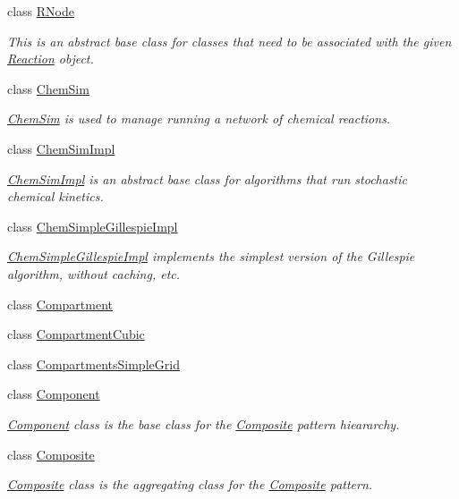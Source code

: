 \begin{DoxyCompactItemize}
class \hyperlink{classchem_1_1RNode}{R\-Node}
\begin{DoxyCompactList}\small\item\em This is an abstract base class for classes that need to be associated with the given \hyperlink{classchem_1_1Reaction}{Reaction} object. \end{DoxyCompactList}\item 
class \hyperlink{classchem_1_1ChemSim}{Chem\-Sim}
\begin{DoxyCompactList}\small\item\em \hyperlink{classchem_1_1ChemSim}{Chem\-Sim} is used to manage running a network of chemical reactions. \end{DoxyCompactList}\item 
class \hyperlink{classchem_1_1ChemSimImpl}{Chem\-Sim\-Impl}
\begin{DoxyCompactList}\small\item\em \hyperlink{classchem_1_1ChemSimImpl}{Chem\-Sim\-Impl} is an abstract base class for algorithms that run stochastic chemical kinetics. \end{DoxyCompactList}\item 
class \hyperlink{classchem_1_1ChemSimpleGillespieImpl}{Chem\-Simple\-Gillespie\-Impl}
\begin{DoxyCompactList}\small\item\em \hyperlink{classchem_1_1ChemSimpleGillespieImpl}{Chem\-Simple\-Gillespie\-Impl} implements the simplest version of the Gillespie algorithm, without caching, etc. \end{DoxyCompactList}\item 
class \hyperlink{classchem_1_1Compartment}{Compartment}
\item 
class \hyperlink{classchem_1_1CompartmentCubic}{Compartment\-Cubic}
\item 
class \hyperlink{classchem_1_1CompartmentsSimpleGrid}{Compartments\-Simple\-Grid}
\item 
class \hyperlink{classchem_1_1Component}{Component}
\begin{DoxyCompactList}\small\item\em \hyperlink{classchem_1_1Component}{Component} class is the base class for the \hyperlink{classchem_1_1Composite}{Composite} pattern hieararchy. \end{DoxyCompactList}\item 
class \hyperlink{classchem_1_1Composite}{Composite}
\begin{DoxyCompactList}\small\item\em \hyperlink{classchem_1_1Composite}{Composite} class is the aggregating class for the \hyperlink{classchem_1_1Composite}{Composite} pattern. \end{DoxyCompactList}\item 

\end{DoxyCompactItemize}
